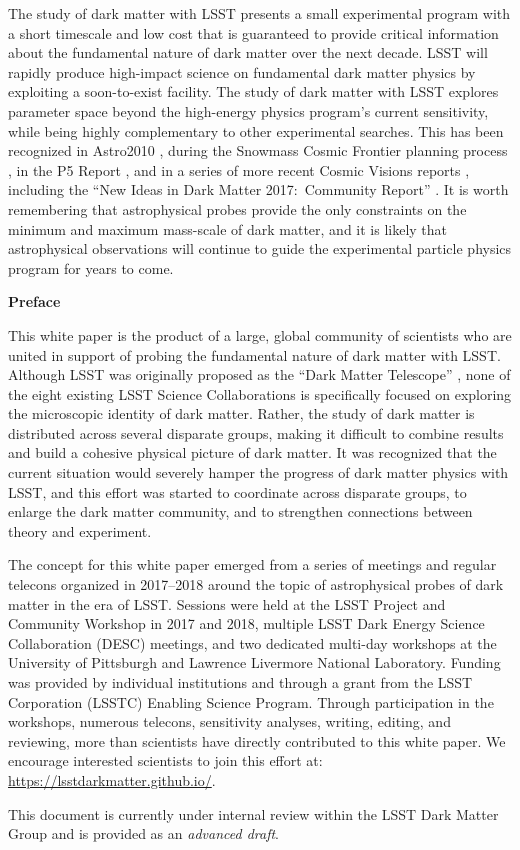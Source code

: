 The study of dark matter with LSST presents a small experimental program with a short timescale and low cost that is guaranteed to provide critical information about the fundamental nature of dark matter over the next decade.
LSST will rapidly produce high-impact science on fundamental dark matter physics by exploiting a soon-to-exist facility. 
The study of dark matter with LSST explores parameter space beyond the high-energy physics program's current sensitivity, while being highly complementary to other experimental searches. %
This has been recognized in Astro2010 \citep{Astro2010}, during the Snowmass Cosmic Frontier planning process \citep[\eg,][]{1305.1605, 1310.8642, 1310.5662}, in the P5 Report \citep[]{P5Report}, and in a series of more recent Cosmic Visions reports \citep[\eg,][]{1604.07626,1802.07216}, including the ``New Ideas in Dark Matter 2017:\ Community Report'' \citep{Battaglieri:2017aum}.
It is worth remembering that astrophysical probes provide the only constraints on the minimum and maximum mass-scale of dark matter, and it is likely that astrophysical observations will continue to guide the experimental particle physics program for years to come.

\clearpage

\begin{center}
  {\Large \bf Preface}
\end{center}

This white paper is the product of a large, global community of scientists who are united in support of probing the fundamental nature of dark matter with LSST.
Although LSST was originally proposed as the ``Dark Matter Telescope'' \citep{Tyson:2001}, none of the eight existing LSST Science Collaborations is specifically focused on exploring the microscopic identity of dark matter.
Rather, the study of dark matter is distributed across several disparate groups, making it difficult to combine results and build a cohesive physical picture of dark matter.
It was recognized that the current situation would severely hamper the progress of dark matter physics with LSST, and this effort was started to coordinate across disparate groups, to enlarge the dark matter community, and to strengthen connections between theory and experiment.

The concept for this white paper emerged from a series of meetings and regular telecons organized in 2017--2018 around the topic of astrophysical probes of dark matter in the era of LSST.
Sessions were held at the LSST Project and Community Workshop in 2017 and 2018, multiple LSST Dark Energy Science Collaboration (DESC) meetings, and two dedicated multi-day workshops at the University of Pittsburgh and Lawrence Livermore National Laboratory.
Funding was provided by individual institutions and through a grant from the LSST Corporation (LSSTC) Enabling Science Program.
Through participation in the workshops, numerous telecons, sensitivity analyses, writing, editing, and reviewing, more than  scientists have directly contributed to this white paper.
We encourage interested scientists to join this effort at: \url{https://lsstdarkmatter.github.io/}.

This document is currently under internal review within the LSST Dark Matter Group and is provided as an \emph{advanced draft}.

